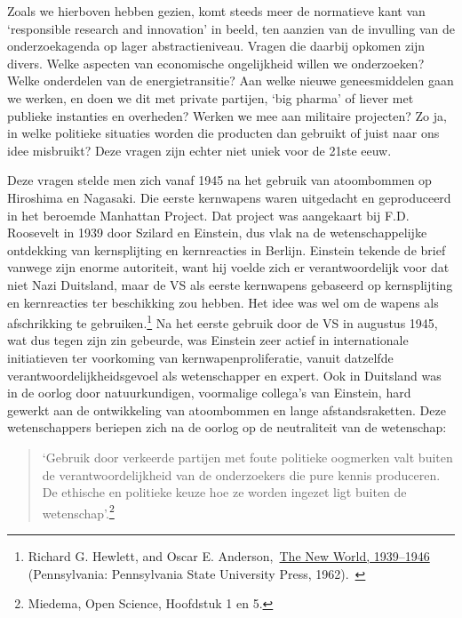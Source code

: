 \documentclass{jote-book}
\begin{document}
	Zoals we hierboven hebben gezien, komt steeds meer de normatieve kant van ‘responsible research and innovation' in beeld, ten aanzien van de invulling van de onderzoekagenda op lager abstractieniveau. Vragen die daarbij opkomen zijn divers. Welke aspecten van economische ongelijkheid willen we onderzoeken? Welke onderdelen van de energietransitie? Aan welke nieuwe geneesmiddelen gaan we werken, en doen we dit met private partijen, ‘big pharma' of liever met publieke instanties en overheden? Werken we mee aan militaire projecten? Zo ja, in welke politieke situaties worden die producten dan gebruikt of juist naar ons idee misbruikt? Deze vragen zijn echter niet uniek voor de 21ste eeuw.



	Deze vragen stelde men zich vanaf 1945 na het gebruik van atoombommen op Hiroshima en Nagasaki. Die eerste kernwapens waren uitgedacht en geproduceerd in het beroemde Manhattan Project. Dat project was aangekaart bij F.D. Roosevelt in 1939 door Szilard en Einstein, dus vlak na de wetenschappelijke ontdekking van kernsplijting en kernreacties in Berlijn. Einstein tekende de brief vanwege zijn enorme autoriteit, want hij voelde zich er verantwoordelijk voor dat niet Nazi Duitsland, maar de VS als eerste kernwapens gebaseerd op kernsplijting en kernreacties ter beschikking zou hebben. Het idee was wel om de wapens als afschrikking te gebruiken.\footnote{Richard G. Hewlett, and Oscar E. Anderson, \href{about:blank}{The New World, 1939--1946} (Pennsylvania: Pennsylvania State University Press, 1962).  } Na het eerste gebruik door de VS in augustus 1945, wat dus tegen zijn zin gebeurde, was Einstein zeer actief in internationale initiatieven ter voorkoming van kernwapenproliferatie, vanuit datzelfde verantwoordelijkheidsgevoel als wetenschapper en expert. Ook in Duitsland was in de oorlog door natuurkundigen, voormalige collega's van Einstein, hard gewerkt aan de ontwikkeling van atoombommen en lange afstandsraketten. Deze wetenschappers beriepen zich na de oorlog op de neutraliteit van de wetenschap:

	\begin{quote}
		\itshape

		‘Gebruik door verkeerde partijen met foute politieke oogmerken valt buiten de verantwoordelijkheid van de onderzoekers die pure kennis produceren. De ethische en politieke keuze hoe ze worden ingezet ligt buiten de wetenschap'.\footnote{Miedema, Open Science, Hoofdstuk 1 en 5.}
	\end{quote}
\end{document}
